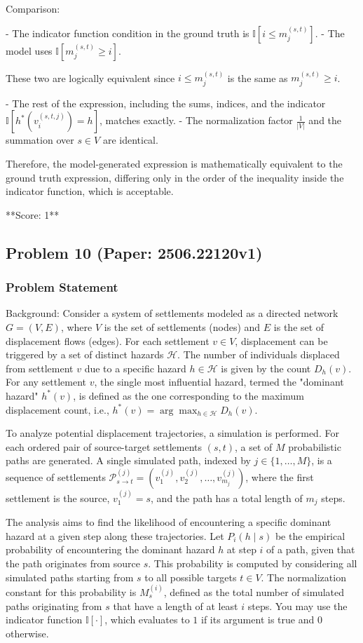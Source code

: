 \documentclass[10pt]{article}
\begin{document}
Comparison:

- The indicator function condition in the ground truth is $\mathbb{I}[i \leq m_j^{(s,t)}]$.
- The model uses $\mathbb{I}[m_j^{(s,t)} \geq i]$.

These two are logically equivalent since $i \leq m_j^{(s,t)}$ is the same as $m_j^{(s,t)} \geq i$.

- The rest of the expression, including the sums, indices, and the indicator $\mathbb{I}[h^*(v_i^{(s,t,j)}) = h]$, matches exactly.
- The normalization factor $\frac{1}{|V|}$ and the summation over $s \in V$ are identical.

Therefore, the model-generated expression is mathematically equivalent to the ground truth expression, differing only in the order of the inequality inside the indicator function, which is acceptable.

**Score: 1**

\newpage
\subsection*{Problem 10 (Paper: 2506.22120v1)}
\subsubsection*{Problem Statement}
Background:
Consider a system of settlements modeled as a directed network $G=(V,E)$, where $V$ is the set of settlements (nodes) and $E$ is the set of displacement flows (edges). For each settlement $v \in V$, displacement can be triggered by a set of distinct hazards $\mathcal{H}$. The number of individuals displaced from settlement $v$ due to a specific hazard $h \in \mathcal{H}$ is given by the count $D_h(v)$. For any settlement $v$, the single most influential hazard, termed the "dominant hazard" $h^*(v)$, is defined as the one corresponding to the maximum displacement count, i.e., $h^*(v) = \arg\max_{h \in \mathcal{H}} D_h(v)$.

To analyze potential displacement trajectories, a simulation is performed. For each ordered pair of source-target settlements $(s, t)$, a set of $M$ probabilistic paths are generated. A single simulated path, indexed by $j \in \{1, \dots, M\}$, is a sequence of settlements $\mathcal{P}^{(j)}_{s \to t} = (v^{(j)}_1, v^{(j)}_2, \dots, v^{(j)}_{m_j})$, where the first settlement is the source, $v^{(j)}_1 = s$, and the path has a total length of $m_j$ steps.

The analysis aims to find the likelihood of encountering a specific dominant hazard at a given step along these trajectories. Let $P_i(h \mid s)$ be the empirical probability of encountering the dominant hazard $h$ at step $i$ of a path, given that the path originates from source $s$. This probability is computed by considering all simulated paths starting from $s$ to all possible targets $t \in V$. The normalization constant for this probability is $M_s^{(i)}$, defined as the total number of simulated paths originating from $s$ that have a length of at least $i$ steps. You may use the indicator function $\mathbb{I}[\cdot]$, which evaluates to $1$ if its argument is true and $0$ otherwise.
\end{document}
